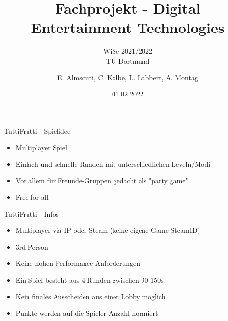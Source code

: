 \documentclass[xcolor=dvipsnames]{beamer}
\title{Fachprojekt - Digital Entertainment Technologies}
\subtitle{WiSe 2021/2022 \\ TU Dortmund}
\author{E. Almsouti, C. Kolbe,  L. Labbert, A. Montag}
\institute{}
\date{01.02.2022}
\begin{document}
\begin{frame}
\titlepage
\end{frame}

\begin{frame}{TuttiFrutti - Spielidee}
\begin{itemize}
\item Multiplayer Spiel
\item Einfach und schnelle Runden mit unterschiedlichen Leveln/Modi \item Vor allem für Freunde-Gruppen gedacht als "party game"
\item Free-for-all 
\end{itemize}

\end{frame}

\begin{frame}{TuttiFrutti - Infos}
\begin{itemize}
\item  Multiplayer via IP oder Steam (keine eigene Game-SteamID) 
\item 3rd Person
\item Keine hohen Performance-Anforderungen 
\item Ein Spiel besteht aus 4 Runden zwischen 90-150s 
\item Kein finales Ausscheiden aus einer Lobby möglich
\item Punkte werden auf die Spieler-Anzahl normiert

\end{itemize}

\end{frame}
\end{document}
